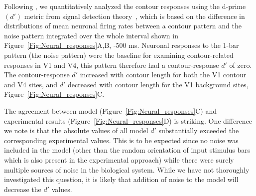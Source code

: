 %

Following \cite{Chen_etal14}, 
we quantitatively analyzed the contour responses using the d-prime
$(d')$ metric from signal detection theory~\citep{Green_Swets66}, which
is based on the difference in distributions of mean neuronal firing
rates between a contour pattern and the noise pattern integrated over
the whole interval shown in Figure~\ref{Fig:Neural_responses}A,B, -500 ms.  Neuronal responses to the 1-bar pattern (the noise pattern)
were the baseline for examining contour-related responses in V1 and
V4, this pattern therefore had a contour-response $d'$ of zero. The
contour-response $d'$ increased with contour length for both the V1
contour and V4 sites, and $d'$ decreased with contour length for the V1
background sites, Figure~\ref{Fig:Neural_responses}C.

The agreement between model (Figure~\ref{Fig:Neural_responses}C) and
experimental results (Figure~\ref{Fig:Neural_responses}D) is striking.
One difference we note is that the absolute values of all model $d'$
substantially 
exceeded the corresponding experimental values. 
This is to be expected since
no noise was included in the model (other than the random orientation of input
stimulus bars which is also present in the experimental approach)
while there were surely multiple sources of noise in the biological
system. While we have not thoroughly investigated this question, it is
likely that addition of noise to the model will decrease the $d'$
values.


